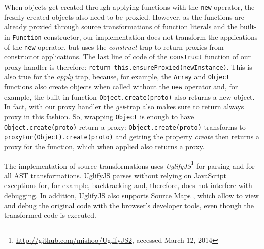 When objects get created through applying functions with the \lstinline{new} operator, the freshly created objects also need to be proxied.
However, as the functions are already proxied through source transformations of function literals and the built-in \lstinline{Function} constructor, our implementation does not transform the applications of the \lstinline{new} operator, but uses the \emph{construct} trap to return proxies from constructor applications.
The last line of code of the \lstinline{construct} function of our proxy handler is therefore: \lstinline{return this.ensureProxied(newInstance)}.
This is also true for the \emph{apply} trap, because, for example, the \lstinline{Array} and \lstinline{Object} functions also create objects when called without the \lstinline{new} operator and, for example, the built-in function \lstinline{Object.create(proto)} also returns a new object.
In fact, with our proxy handler the \emph{get}-trap also makes sure to return always proxy in this fashion.
So, wrapping \lstinline{Object} is enough to have \lstinline{Object.create(proto)} return a proxy: \lstinline{Object.create(proto)} transforms to \lstinline{proxyFor(Object).create(proto)} and getting the property \emph{create} then returns a proxy for the function, which when applied also returns a proxy.

The implementation of source transformations uses \emph{UglifyJS}\footnote{\url{http://github.com/mishoo/UglifyJS2}, accessed March 12, 2014} for parsing and for all AST transformations.
UglifyJS parses without relying on JavaScript exceptions for, for example, backtracking and, therefore, does not interfere with debugging.
In addition, UglifyJS also supports Source Maps , which allow to view and debug the original code with the browser's developer tools, even though the transformed code is executed.



